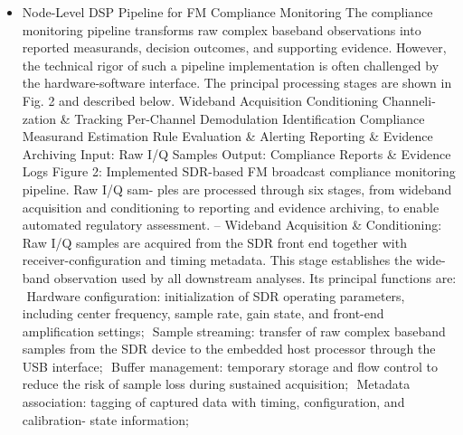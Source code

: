 \documentclass[11pt,a4paper]{article}
\begin{document}
{\begin{itemize}
Heuristic Analysis: The document mentions "Cuáles son las 6 etapas del pipeline de monitoreo FM y qué hace cada una?"" in several sections. Key findings related to this query include: Uncertainty Budget and Reporting
All measurements intended for regulatory compliance use shall be accompanied by a documented
uncertainty  evaluation  in  accordance  with  the  Guide  to  the  Expression  of  Uncertainty  in  Mea-
surement (GUM) [?].  The uncertainty budget shall account for all known sources of random and
systematic error, shall be traceable to the calibration hierarchy defined above, and shall be reported
alongside the measurand value in all compliance records and evidence archives.
Uncertainty Classification, the associated Uncertainty-Aware Compliance Decisions, and Peri-
odic Re-Evaluation Requirements are detailed in Appendix
\item Node-Level DSP Pipeline for FM Compliance Monitoring
The compliance monitoring pipeline transforms raw complex baseband observations into reported
measurands, decision outcomes, and supporting evidence.  However, the technical rigor of such a
pipeline implementation is often challenged by the hardware-software interface.
The principal processing stages are shown in Fig. 2 and described below.
Wideband
Acquisition
Conditioning
Channeli-
zation \&
Tracking
Per-Channel
Demodulation
Identification
Compliance
Measurand
Estimation
Rule
Evaluation
\& Alerting
Reporting
\& Evidence
Archiving
Input:
Raw I/Q
Samples
Output:
Compliance Reports
\& Evidence Logs
Figure 2:  Implemented SDR-based FM broadcast compliance monitoring pipeline.  Raw I/Q sam-
ples are processed through six stages, from wideband acquisition and conditioning to reporting and
evidence archiving, to enable automated regulatory assessment.
– Wideband Acquisition \& Conditioning:  Raw I/Q samples are acquired from the SDR front end
together with receiver-configuration and timing metadata.  This stage establishes the wide-
band observation used by all downstream analyses.
Its principal functions are:
  Hardware  configuration:   initialization  of  SDR  operating  parameters,  including  center
frequency, sample rate, gain state, and front-end amplification settings;
  Sample  streaming:  transfer of raw complex baseband samples from the SDR device to
the embedded host processor through the USB interface;
  Buffer  management:  temporary storage and flow control to reduce the risk of sample
loss during sustained acquisition;
  Metadata association:  tagging of captured data with timing, configuration, and calibration-
state information;

\end{itemize}}
\end{document}
